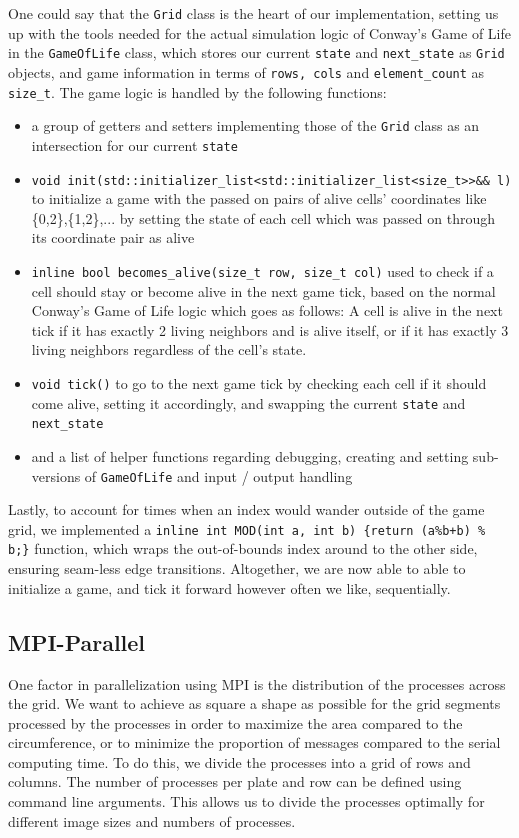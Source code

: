 \documentclass[11pt]{article}
\begin{document}
One could say that the \texttt{Grid} class is the heart of our implementation, setting us up with the tools needed for the actual simulation logic of Conway's Game of Life in the \texttt{GameOfLife} class, which stores our current \texttt{state} and \texttt{next\_state} as \texttt{Grid} objects, and game information in terms of \texttt{rows, cols} and \texttt{element\_count} as \texttt{size\_t}. The game logic is handled by the following functions:
\begin{itemize}
    \item a group of getters and setters implementing those of the \texttt{Grid} class as an intersection for our current \texttt{state}
    \item \texttt{void init(std::initializer\_list<std::initializer\_list<size\_t>>\&\& l)} to initialize a game with the passed on pairs of alive cells' coordinates like \{0,2\},\{1,2\},... by setting the state of each cell which was passed on through its coordinate pair as alive
    \item \texttt{inline bool becomes\_alive(size\_t row, size\_t col)} used to check if a cell should stay or become alive in the next game tick, based on the normal Conway's Game of Life logic which goes as follows: A cell is alive in the next tick if it has exactly 2 living neighbors and is alive itself, or if it has exactly 3 living neighbors regardless of the cell's state.
    \item \texttt{void tick()} to go to the next game tick by checking each cell if it should come alive, setting it accordingly, and swapping the current \texttt{state} and \texttt{next\_state}
    \item and a list of helper functions regarding debugging, creating and setting sub-versions of \texttt{GameOfLife} and input / output handling
\end{itemize}

Lastly, to account for times when an index would wander outside of the game grid, we implemented a \texttt{inline int MOD(int a, int b) \{return (a\%b+b) \% b;\}} function, which wraps the out-of-bounds index around to the other side, ensuring seam-less edge transitions. 
Altogether, we are now able to able to initialize a game, and tick it forward however often we like, sequentially.

\subsection{MPI-Parallel}
One factor in parallelization using MPI is the distribution of the processes across the grid. We want to achieve as square a shape as possible for the grid segments processed by the processes in order to maximize the area compared to the circumference, or to minimize the proportion of messages compared to the serial computing time. To do this, we divide the processes into a grid of rows and columns. The number of processes per plate and row can be defined using command line arguments. This allows us to divide the processes optimally for different image sizes and numbers of processes. 
\end{document}
